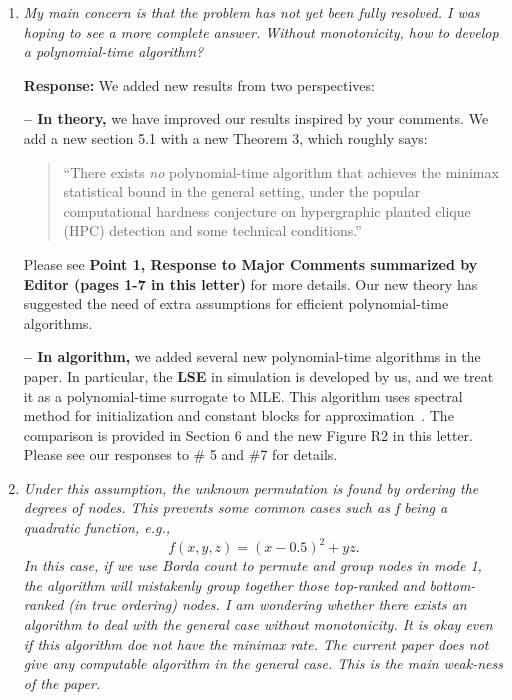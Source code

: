 \documentclass[11pt]{article}
\theoremstyle{plain}
\theoremstyle{definition}
\begin{document}
\begin{enumerate}[wide, labelwidth=!, labelindent=0pt]
    \item \textit{My main concern is that the problem has not yet been fully resolved. I was hoping to see a more complete answer. Without monotonicity, how to develop a polynomial-time algorithm? }
    
    
    
\textbf{Response: }
We added new results from two perspectives:

{\bf -- In theory,} we have improved our results inspired by your comments. We add a new section 5.1 with a new Theorem 3, which roughly says:

\begin{quote}
\color{blue}
``There exists \emph{no} polynomial-time algorithm that achieves the minimax statistical bound in the general setting, under the popular computational hardness conjecture on hypergraphic planted clique (HPC) detection and some technical conditions.''
\end{quote}
    Please see \textbf{Point 1, Response to Major Comments summarized by Editor (pages 1-7 in this letter)} for more details. Our new theory has suggested the need of extra assumptions for efficient polynomial-time algorithms. 
 

  {\bf -- In algorithm,} we added several new polynomial-time algorithms in the paper. In particular, the \textbf{\small LSE} in simulation is developed by us, and we treat it as a polynomial-time surrogate to MLE. This algorithm uses spectral method for initialization and constant blocks for approximation~\citep{han2022exact}. The comparison is provided in Section 6 and the new Figure R2 in this letter. Please see our responses to \# 5 and \#7 for details. 
 
    
    \item \textit{ Under this assumption, the unknown permutation is found by ordering the degrees of nodes. This prevents some common cases such as f being a quadratic function, e.g.,
    \begin{equation}\label{eq:example}
        f(x,y,z)=(x-0.5)^2 +yz.
    \end{equation}
    In this case, if we use Borda count to permute and group nodes in mode 1, the algorithm will mistakenly group together those top-ranked and bottom-ranked (in true ordering) nodes. I am wondering whether there exists an algorithm to deal with the general case without monotonicity. It is okay even if this algorithm doe not have the minimax rate. The current paper does not give any computable algorithm in the general case. This is the main weak-ness of the paper.}   


\end{enumerate}
\end{document}
